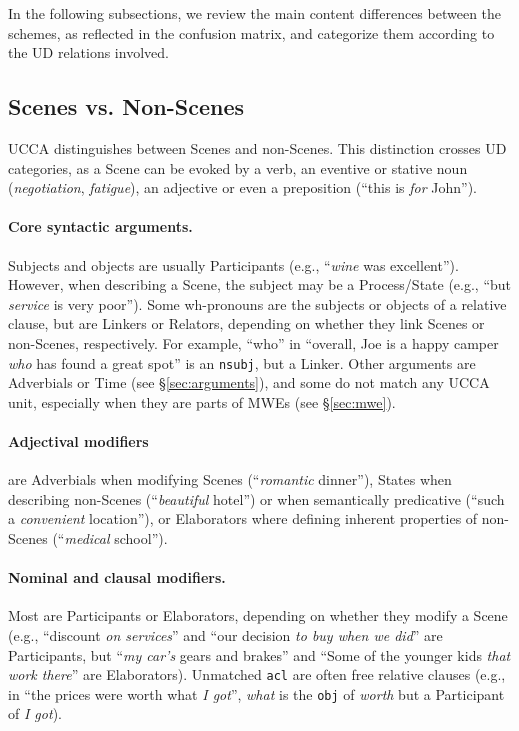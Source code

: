 \documentclass[11pt,a4paper,table]{article}
\begin{document}
In the following subsections, we review the main content differences between the schemes,
as reflected in the confusion matrix, and categorize them according to the UD relations
involved.

\subsection{Scenes vs. Non-Scenes}\label{sec:s}

UCCA distinguishes between Scenes and non-Scenes.
This distinction crosses UD categories,
as a Scene can be evoked by a verb, an eventive or stative
noun (\textit{negotiation}, \textit{fatigue}),
an adjective or even a preposition (``this is \textit{for} John'').

\paragraph{Core syntactic arguments.}
      Subjects and objects are usually Participants (e.g., ``\textit{wine} was excellent'').
      However, when describing a Scene, the subject may be a Process/State
      (e.g., ``but \textit{service} is very poor'').
      Some wh-pronouns are the subjects or objects of a relative clause, but
      are Linkers or Relators,
      depending on whether they link Scenes or non-Scenes, respectively.
      For example, ``who'' in ``overall, Joe is a happy camper \textit{who} has found a great spot'' is an \texttt{nsubj}, but a Linker.
      Other arguments are Adverbials or Time (see \S\ref{sec:arguments}), and
      some do not match any UCCA unit, especially when they are parts of MWEs (see \S\ref{sec:mwe}).

\paragraph{Adjectival modifiers} are Adverbials when modifying Scenes
    (``\textit{romantic} dinner''), States when describing non-Scenes (``\textit{beautiful} hotel'') 
    or when semantically predicative (``such a \textit{convenient} location''), or
    Elaborators where defining inherent properties of non-Scenes (``\textit{medical} school'').

\paragraph{Nominal and clausal modifiers.}
    Most are Participants or Elaborators,
    depending on whether they modify a Scene (e.g.,
    ``discount \textit{on services}'' and
    ``our decision \textit{to buy when we did}'' are Participants,
    but ``\textit{my car's} gears and brakes'' and ``Some of the younger kids \textit{that work there}'' are Elaborators).
    Unmatched \texttt{acl} are often
    free relative clauses (e.g., in ``the prices were worth what \textit{I got}'',
    \textit{what} is the \texttt{obj} of \textit{worth} but
    a Participant of \textit{I got}).
\end{document}

